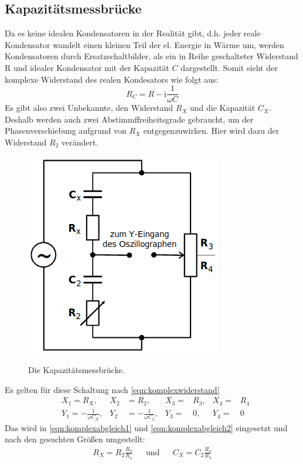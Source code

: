\documentclass[titlepage = firstcover]{scrartcl}
\begin{document}
        \subsection{Kapazitätsmessbrücke}
          Da es keine idealen Kondensatoren in der Realität gibt, d.h. jeder reale Kondensator wandelt einen kleinen Teil der el. Energie in Wärme um,
          werden Kondensatoren durch Ersatzschaltbilder, als ein in Reihe geschalteter Widerstand R und idealer Kondensator mit der Kapazität $C$ dargestellt.
          Somit sieht der komplexe Widerstand des realen Kondesators wie folgt aus:
          \begin{equation}
            R_C = R - \text{i} \frac{1}{\omega C}
          \end{equation}
          Es gibt also zwei Unbekannte, den Widerstand $R_X$ und die Kapazität $C_X$. Deshalb werden auch zwei Abstimmffreiheitsgrade gebraucht, um der
          Phasenverschiebung aufgrund von $R_X$ entgegenzuwirken. Hier wird dazu der Widerstand $R_2$ verändert.
          \begin{figure}[h]
            \centering
            \caption{Die Kapazitätsmessbrücke.}
            \includegraphics[width = 0.4\linewidth]{Kapazitaetsmessbruecke.png}
            \label{fig:wheatstone}
          \end{figure}
          Es gelten für diese Schaltung nach \eqref{eqn:komplexwiderstand}
          \begin{align*}
            &X_1 = R_X, & X_2 &= R_2, & X_3 =& R_3, & X_4 =& R_4 \\
            &Y_1 = -\frac{1}{\omega C_X}, & Y_2 &= -\frac{1}{\omega C_2}, & Y_3 =& 0, & Y_4 =& 0
          \end{align*}
          Das wird in \eqref{eqn:komplexabgleich1} und \eqref{eqn:komplexabgleich2} eingesetzt und nach den gesuchten Größen umgestellt:
          \begin{align}
            R_X = R_2 \frac{R_3}{R_4} &&\text{und}&& C_X = C_2 \frac{R_4}{R_3}            
          \end{align}
\end{document}
